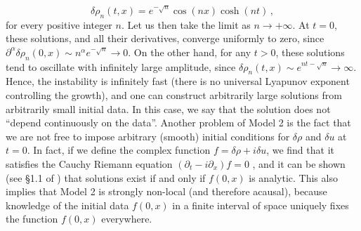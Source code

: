 \documentclass[a4paper, amsfonts, amssymb, amsmath, reprint, showkeys, nofootinbib, twoside, onecolumn,notitlepage]{revtex4-1}
\begin{document}
\begin{equation}
\delta \rho_n(t,x)= e^{-\sqrt{n}}\cos(nx)\cosh(nt) \, ,
\end{equation} 
for every positive integer $n$. Let us then take the limit as $n \rightarrow +\infty$. At $t=0$, these solutions, and all their derivatives, converge uniformly to zero, since $\partial^\alpha\delta \rho_n(0,x) \sim n^\alpha e^{-\sqrt{n}} \rightarrow 0$. On the other hand, for any $t>0$, these solutions tend to oscillate with infinitely large amplitude, since $\delta \rho_n(t,x) \sim e^{nt-\sqrt{n}}\rightarrow \infty$. Hence, the instability is infinitely fast (there is no universal Lyapunov exponent controlling the growth), and one can construct arbitrarily large solutions from arbitrarily small initial data. In this case, we say that the solution does not ``depend continuously on the data''. Another problem of Model 2 is the fact that we are not free to impose arbitrary (smooth) initial conditions for $\delta \rho$ and $\delta u$ at $t=0$. In fact, if we define the complex function $f=\delta \rho + i \delta u$, we find that it satisfies the Cauchy Riemann equation $(\partial_t -i\partial_x)f=0$ \cite{Benzoni_book}, and it can be shown (see \S 1.1 of \citet{Rauch_book}) that solutions exist if and only if $f(0,x)$ is analytic. This also implies that Model 2 is strongly non-local (and therefore acausal), because knowledge of the initial data $f(0,x)$ in a finite interval of space uniquely fixes the function $f(0,x)$ everywhere.
\end{document}
